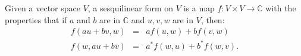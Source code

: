 Given a vector space $V$, a sesquilinear form on $V$ is a map $
f : V \times V \to \mathbb{C} $ with the
properties that if $a$ and $b$ are in $ \mathbb{C} $ and $u, v, w$ are in $V$,
then: 
\begin{eqnarray*}
f(au+bv,w) &=& af(u,w)+bf(v,w)\\
f(w,au+bv) &=& a^{*}f(w,u)+b^{*}f(w,v).
\end{eqnarray*}